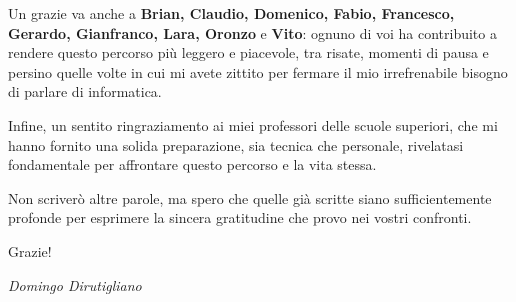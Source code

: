 \vspace{1em}
Un grazie va anche a \textbf{Brian, Claudio, Domenico, Fabio, Francesco, Gerardo, Gianfranco, Lara, Oronzo} e \textbf{Vito}: ognuno di voi ha contribuito a rendere questo percorso più leggero e piacevole, tra risate, momenti di pausa e persino quelle volte in cui mi avete zittito per fermare il mio irrefrenabile bisogno di parlare di informatica.

\vspace{1em}
Infine, un sentito ringraziamento ai miei professori delle scuole superiori, che mi hanno fornito una solida preparazione, sia tecnica che personale, rivelatasi fondamentale per affrontare questo percorso e la vita stessa.

\vspace{1em}
Non scriverò altre parole, ma spero che quelle già scritte siano sufficientemente profonde per esprimere la sincera gratitudine che provo nei vostri confronti.

Grazie!\\
\begin{flushright}
    \textit{Domingo Dirutigliano}
\end{flushright}